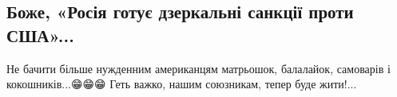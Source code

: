  
 
 
 
 
\subsection{Боже, «Росія готує дзеркальні санкції проти США»...}

Не бачити більше нужденним американцям матрьошок, балалайок, самоварів і кокошників...😁😁😁
Геть важко, нашим союзникам, тепер буде жити!...🤣
